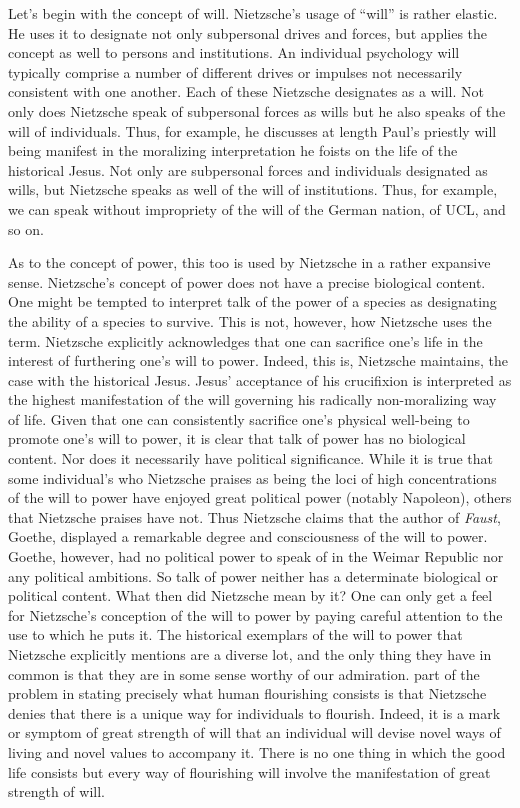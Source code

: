 Let's begin with the concept of will. Nietzsche's usage of ``will'' is rather elastic. He uses it to designate not only subpersonal drives and forces, but applies the concept as well to persons and institutions. An individual psychology will typically comprise a number of different drives or impulses not necessarily consistent with one another. Each of these Nietzsche designates as a will. Not only does Nietzsche speak of subpersonal forces as wills but he also speaks of the will of individuals. Thus, for example, he discusses at length Paul's priestly will being manifest in the moralizing interpretation he foists on the life of the historical Jesus. Not only are subpersonal forces and individuals designated as wills, but Nietzsche speaks as well of the will of institutions. Thus, for example, we can speak without impropriety of the will of the German nation, of UCL, and so on.

As to the concept of power, this too is used by Nietzsche in a rather expansive sense. Nietzsche's concept of power does not have a precise biological content. One might be tempted to interpret talk of the power of a species as designating the ability of a species to survive. This is not, however, how Nietzsche uses the term. Nietzsche explicitly acknowledges that one can sacrifice one's life in the interest of furthering one's will to power. Indeed, this is, Nietzsche maintains, the case with the historical Jesus. Jesus' acceptance of his crucifixion is interpreted as the highest manifestation of the will governing his radically non-moralizing way of life. Given that one can consistently sacrifice one's physical well-being to promote one's will to power, it is clear that talk of power has no biological content. Nor does it necessarily have political significance. While it is true that some individual's who Nietzsche praises as being the loci of high concentrations of the will to power have enjoyed great political power (notably Napoleon), others that Nietzsche praises have not. Thus Nietzsche claims that the author of \emph{Faust}, Goethe, displayed a remarkable degree and consciousness of the will to power. Goethe, however, had no political power to speak of in the Weimar Republic nor any political ambitions. So talk of power neither has a determinate biological or political content. What then did Nietzsche mean by it? One can only get a feel for Nietzsche's conception of the will to power by paying careful attention to the use to which he puts it. The historical exemplars of the will to power that Nietzsche explicitly mentions are a diverse lot, and the only thing they have in common is that they are in some sense worthy of our admiration. part of the problem in stating precisely what human flourishing consists is that Nietzsche denies that there is a unique way for individuals to flourish. Indeed, it is a mark or symptom of great strength of will that an individual will devise novel ways of living and novel values to accompany it. There is no one thing in which the good life consists but every way of flourishing will involve the manifestation of great strength of will.


